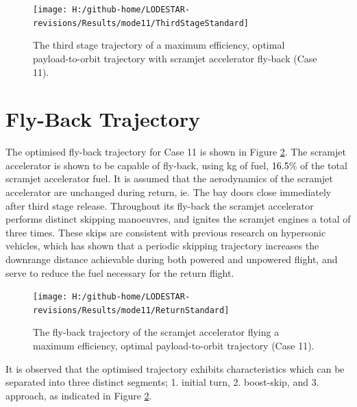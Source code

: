 \begin{figure}[ht!]%
\centering
\texttt{[image: H:/github-home/LODESTAR-revisions/Results/mode11/ThirdStageStandard]}
\caption{The third stage trajectory of a maximum efficiency, optimal payload-to-orbit trajectory with scramjet accelerator fly-back (Case 11). }
\label{fig:ThirdStageStandard}
\end{figure}


\section{Fly-Back Trajectory}
\noindent
The optimised fly-back trajectory for Case 11 is shown in Figure \ref{fig:ReturnStandard}.
The scramjet accelerator is shown to be capable of fly-back, using \returnFuelStandard kg of fuel, \textcolor{black}{16.5}\% of the total scramjet accelerator fuel. It is assumed that the aerodynamics of the scramjet accelerator are unchanged during return, ie. The bay doors close immediately after third stage release. 
Throughout its fly-back the scramjet accelerator performs distinct skipping manoeuvres, and ignites the scramjet engines a total of three times. 
These skips are consistent with previous research on hypersonic vehicles, which has shown that a periodic skipping trajectory increases the downrange distance achievable during both powered and unpowered flight\cite{Moshman2014,Darby2011,Toso2015,Tetlow1992,Eggers1957,Kanda2007,Chai2015}, and serve to reduce the fuel necessary for the return flight. 
\begin{figure}[ht!] %
	\centering
	\texttt{[image: H:/github-home/LODESTAR-revisions/Results/mode11/ReturnStandard]}
	\caption{The fly-back trajectory of the scramjet accelerator flying a maximum efficiency, optimal payload-to-orbit trajectory (Case 11). }
	\label{fig:ReturnStandard}
\end{figure}

It is observed that the optimised trajectory exhibits characteristics which can be separated into three distinct segments; 1. initial turn, 2. boost-skip, and 3. approach, as indicated in Figure \ref{fig:ReturnStandard}. 
 
